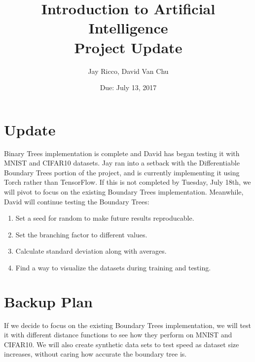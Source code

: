 \documentclass[10pt,letterpaper]{article}
\author{Jay Ricco, David Van Chu}
\title{Introduction to Artificial Intelligence\\Project Update}
\date{Due: July 13, 2017}
\begin{document}
	\maketitle
	\section{Update}
		Binary Trees implementation is complete and David has began testing it with MNIST and CIFAR10 datasets.
		Jay ran into a setback with the Differentiable Boundary Trees portion of the project, and is currently implementing it using Torch rather than TensorFlow. If this is not completed by Tuesday, July 18th, we will pivot to focus on the existing Boundary Trees implementation. Meanwhile, David will continue testing the Boundary Trees:
		\begin{enumerate}
			\item Set a seed for random to make future results reproducable.
			\item Set the branching factor to different values.
			\item Calculate standard deviation along with averages.
			\item Find a way to visualize the datasets during training and testing.
		\end{enumerate}
		\section{Backup Plan}
		If we decide to focus on the existing Boundary Trees implementation, we will test it with different distance functions to see how they perform on MNIST and CIFAR10. We will also create synthetic data sets to test speed as dataset size increases, without caring how accurate the boundary tree is.
	
\end{document}
